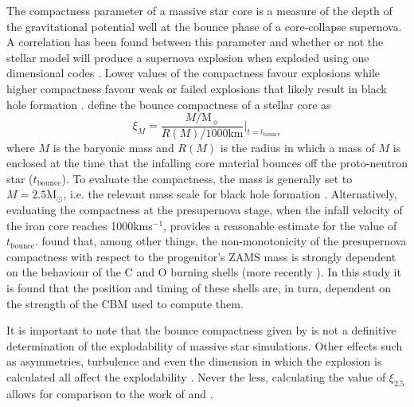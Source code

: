 \documentclass[useAMS,usenatbib]{mn2e}
\newcommand{\Msun}{\ensuremath{\mathrm{M}_\odot}}
\begin{document}
The compactness parameter of a massive star core is a measure of the depth of
the gravitational potential well at the bounce phase of a core-collapse
supernova. A correlation has been found between this parameter and whether 
or not the stellar model will produce a supernova explosion when exploded using 
one dimensional codes
\citep{OConnor2011,Ugliano2012,Ertl2016,Muller2016,Sukhbold2016, Sukhbold2017}. 
Lower values of the compactness favour explosions while higher
compactness favour weak or failed explosions that likely result in black hole
formation \citep{Ugliano2012,Ertl2016}. \citet{OConnor2011} define the bounce 
compactness of a stellar core as
\begin{equation}
\label{eq:2}
\xi_M = \frac{M/\mathrm{M}_{\sun}}{R(M)/1000 \mathrm{km}} \biggr\vert_{t=t_{\mathrm{bounce}}}
\end{equation} 
where $M$ is the baryonic mass and $R(M)$ is the radius in which a mass of 
$M$ is enclosed at the time that the infalling core material bounces off the 
proto-neutron star ($t_{\mathrm{bounce}}$). To evaluate the compactness, the 
mass is generally set to $M = 2.5\Msun$, i.e.  the relevant mass scale for black 
hole formation \citep{OConnor2011}. Alternatively, evaluating the compactness at 
the presupernova stage, when the infall velocity of the iron core reaches 
1000kms$^{-1}$, provides a reasonable estimate for the value of 
$t_{\mathrm{bounce}}$. \citet{Sukhbold2014} found that, among other things, the 
non-monotonicity of the presupernova compactness with respect to the 
progenitor's ZAMS mass is strongly dependent on the behaviour of the C and O 
burning shells (more recently \citet{Sukhbold2017}). In this study it is found 
that the position and timing of these shells are, in turn, dependent on the strength 
of the CBM used to compute them. 

It is important to note that the bounce compactness given by \citet{OConnor2011} is not a definitive determination of the explodability of massive star simulations. Other effects such as asymmetries, turbulence and even the dimension in which the explosion is calculated all affect the explodability \citep{Dolence2013,Radice2017,Muller2016,Ertl2016}. Never the less, calculating the value of $\xi_{2.5}$ allows for comparison to the work of \citet{Sukhbold2017} and \citet{Farmer2016}.
\end{document}
